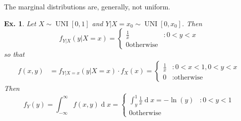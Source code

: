 \documentclass[12pt, a4paper]{book}
\renewcommand{\d}[1]{\ensuremath{\operatorname{d}\!{#1}}} %
\newtheorem{example}[theorem]{Ex.}
\theoremstyle{nonumberplain}
\begin{document}
The marginal distributions are, generally, not uniform.
\begin{example}
    Let $X\sim\operatorname{UNI}[0,1]$ and $Y|X=x_0\sim\operatorname{UNI}[0,x_0]$.
    Then
    \[f_{Y|X}(y|X=x)=\begin{cases}\frac{1}{x} &:0<y<x\\0\text{otherwise}\end{cases}\]
    so that
    \begin{align*}f(x,y) &= f_{Y|X=x}(y|X=x)\cdot f_X(x)=\begin{cases}\frac{1}{x} &:0<x<1,0<y<x\\0&:\text{otherwise}\end{cases}\end{align*}
    Then
    \[f_Y(y)=\int_{-\infty}^\infty f(x,y)\d{x}=\begin{cases}\int_y^1\frac{1}{x}\d{x}=-\ln(y)&:0<y<1\\0\text{otherwise}\end{cases}\]
\end{example}
\end{document}
